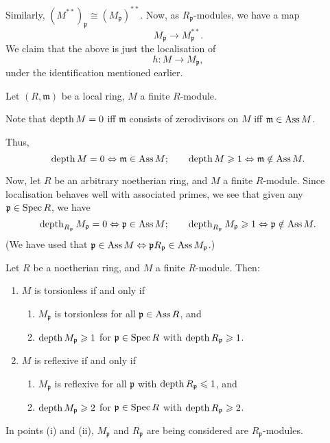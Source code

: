 \documentclass[12pt]{article}
\begin{document}
Similarly, $(M^{\ast \ast})_{\mathfrak{p}} \cong (M_{\mathfrak{p}})^{\ast \ast}$. Now, as $R_{\mathfrak{p}}$-modules, we have a map
\begin{equation*} 
	M_{\mathfrak{p}} \to M_{\mathfrak{p}}^{\ast \ast}.
\end{equation*}
We claim that the above is just the localisation of
\begin{equation*} 
	h : M \to M_{\mathfrak{p}},
\end{equation*}
under the identification mentioned earlier.

\begin{obs} \label{obs:depth-and-ass}
	Let $(R, \mathfrak{m})$ be a local ring, $M$ a finite $R$-module. 

	Note that $\operatorname{depth} M = 0$ iff $\mathfrak{m}$ consists of zerodivisors on $M$ iff $\mathfrak{m} \in \operatorname{Ass} M$. 

	Thus,
	\begin{equation*} 
		\operatorname{depth} M = 0 \Leftrightarrow \mathfrak{m} \in \operatorname{Ass} M; \qquad \operatorname{depth} M \geqslant 1 \Leftrightarrow \mathfrak{m} \notin \operatorname{Ass} M.
	\end{equation*}

	Now, let $R$ be an arbitrary noetherian ring, and $M$ a finite $R$-module. Since localisation behaves well with associated primes, we see that given any $\mathfrak{p} \in \operatorname{Spec} R$, we have
	\begin{equation*} 
		\operatorname{depth}_{R_{\mathfrak{p}}} M_{\mathfrak{p}} = 0 \Leftrightarrow \mathfrak{p} \in \operatorname{Ass} M; \qquad \operatorname{depth}_{R_{\mathfrak{p}}} M_{\mathfrak{p}} \geqslant 1 \Leftrightarrow \mathfrak{p} \notin \operatorname{Ass} M.
	\end{equation*}
	(We have used that $\mathfrak{p} \in \operatorname{Ass} M \Leftrightarrow \mathfrak{p} R_{\mathfrak{p}} \in \operatorname{Ass} M_{\mathfrak{p}}$.)
\end{obs}

\begin{prop}
	Let $R$ be a noetherian ring, and $M$ a finite $R$-module. Then:
	\begin{enumerate}[label=(\alph*)]
		\item $M$ is torsionless if and only if
		\begin{enumerate}[label=(\roman*)]
			\item $M_{\mathfrak{p}}$ is torsionless for all $\mathfrak{p} \in \operatorname{Ass} R$, and
			\item $\operatorname{depth} M_{\mathfrak{p}} \geqslant 1$ for $\mathfrak{p} \in \operatorname{Spec} R$ with $\operatorname{depth} R_{\mathfrak{p}} \geqslant 1$.
		\end{enumerate}
		\item $M$ is reflexive if and only if
		\begin{enumerate}[label=(\roman*)]
			\item $M_{\mathfrak{p}}$ is reflexive for all $\mathfrak{p}$ with $\operatorname{depth} R_{\mathfrak{p}} \leqslant 1$, and
			\item $\operatorname{depth} M_{\mathfrak{p}} \geqslant 2$ for $\mathfrak{p} \in \operatorname{Spec} R$ with $\operatorname{depth} R_{\mathfrak{p}} \geqslant 2$.
		\end{enumerate}
	\end{enumerate}
\end{prop}
In points (i) and (ii), $M_{\mathfrak{p}}$ and $R_{\mathfrak{p}}$ are being considered are $R_{\mathfrak{p}}$-modules.
\end{document}
